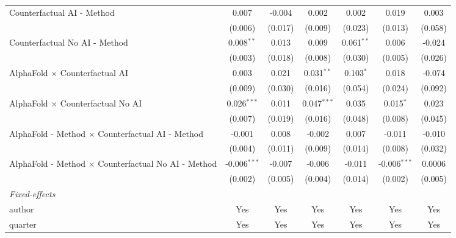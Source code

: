 \begin{tabular}{lcccccc}
   Counterfactual AI - Method                                 & 0.007          & -0.004  & 0.002         & 0.002        & 0.019          & 0.003\\   
                                                              & (0.006)        & (0.017) & (0.009)       & (0.023)      & (0.013)        & (0.058)\\   
   Counterfactual No AI - Method                              & 0.008$^{**}$   & 0.013   & 0.009         & 0.061$^{**}$ & 0.006          & -0.024\\   
                                                              & (0.003)        & (0.018) & (0.008)       & (0.030)      & (0.005)        & (0.026)\\   
   AlphaFold $\times$ Counterfactual AI                       & 0.003          & 0.021   & 0.031$^{**}$  & 0.103$^{*}$  & 0.018          & -0.074\\   
                                                              & (0.009)        & (0.030) & (0.016)       & (0.054)      & (0.024)        & (0.092)\\   
   AlphaFold $\times$ Counterfactual No AI                    & 0.026$^{***}$  & 0.011   & 0.047$^{***}$ & 0.035        & 0.015$^{*}$    & 0.023\\   
                                                              & (0.007)        & (0.019) & (0.016)       & (0.048)      & (0.008)        & (0.045)\\   
   AlphaFold - Method $\times$ Counterfactual AI - Method     & -0.001         & 0.008   & -0.002        & 0.007        & -0.011         & -0.010\\   
                                                              & (0.004)        & (0.011) & (0.009)       & (0.014)      & (0.008)        & (0.032)\\   
   AlphaFold - Method $\times$ Counterfactual No AI - Method  & -0.006$^{***}$ & -0.007  & -0.006        & -0.011       & -0.006$^{***}$ & 0.0006\\   
                                                              & (0.002)        & (0.005) & (0.004)       & (0.014)      & (0.002)        & (0.005)\\   
   \midrule
   \emph{Fixed-effects}\\
   author                                                     & Yes            & Yes     & Yes           & Yes          & Yes            & Yes\\  
   quarter                                                    & Yes            & Yes     & Yes           & Yes          & Yes            & Yes\\  

\end{tabular}
